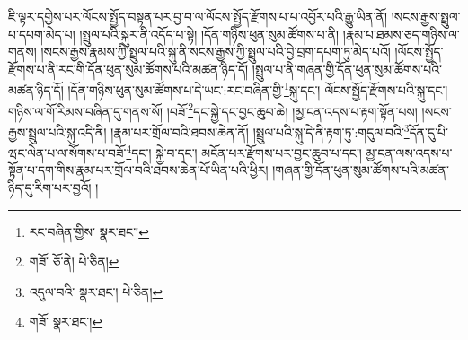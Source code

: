 ཇི་ལྟར་དགྱེས་པར་ལོངས་སྤྱོད་བསྟན་པར་བྱ་བ་ལ་ལོངས་སྤྱོད་རྫོགས་པ་པ་འབྱོར་པའི་རྒྱུ་ཡིན་ནོ། །སངས་རྒྱས་སྤྲུལ་པ་དཔག་མེད་པ། །སྤྲུལ་པའི་སྐུར་ནི་འདོད་པ་སྟེ། །དོན་གཉིས་ཕུན་སུམ་ཚོགས་པ་ནི། །རྣམ་པ་ཐམས་ཅད་གཉིས་ལ་གནས། །སངས་རྒྱས་རྣམས་ཀྱི་སྤྲུལ་པའི་སྐུ་ནི་སངས་རྒྱས་ཀྱི་སྤྲུལ་པའི་བྱེ་བྲག་དཔག་ཏུ་མེད་པའོ། །ལོངས་སྤྱོད་རྫོགས་པ་ནི་རང་གི་དོན་ཕུན་སུམ་ཚོགས་པའི་མཚན་ཉིད་དོ། །སྤྲུལ་པ་ནི་གཞན་གྱི་དོན་ཕུན་སུམ་ཚོགས་པའི་མཚན་ཉིད་དོ། །དོན་གཉིས་ཕུན་སུམ་ཚོགས་པ་དེ་ཡང་:རང་བཞིན་གྱི་\footnote{རང་བཞིན་གྱིས་  སྣར་ཐང་། }སྐུ་དང་། ལོངས་སྤྱོད་རྫོགས་པའི་སྐུ་དང་། གཉིས་ལ་གོ་རིམས་བཞིན་དུ་གནས་སོ། །བཟོ་\footnote{གཟོ་  ཅོ་ནེ།  པེ་ཅིན། }དང་སྐྱེ་དང་བྱང་ཆུབ་ཆེ། །མྱ་ངན་འདས་པ་རྟག་སྟོན་པས། །སངས་རྒྱས་སྤྲུལ་པའི་སྐུ་འདི་ནི། །རྣམ་པར་གྲོལ་བའི་ཐབས་ཆེན་ནོ། །སྤྲུལ་པའི་སྐུ་དེ་ནི་རྟག་ཏུ་:གདུལ་བའི་\footnote{འདུལ་བའི་  སྣར་ཐང་།  པེ་ཅིན། }དོན་དུ་པི་ཝང་ལེན་པ་ལ་སོགས་པ་བཟོ་\footnote{གཟོ་  སྣར་ཐང་། }དང་། སྐྱེ་བ་དང་། མངོན་པར་རྫོགས་པར་བྱང་ཆུབ་པ་དང་། མྱ་ངན་ལས་འདས་པ་སྟོན་པ་དག་གིས་རྣམ་པར་གྲོལ་བའི་ཐབས་ཆེན་པོ་ཡིན་པའི་ཕྱིར། །གཞན་གྱི་དོན་ཕུན་སུམ་ཚོགས་པའི་མཚན་ཉིད་དུ་རིག་པར་བྱའོ། །
